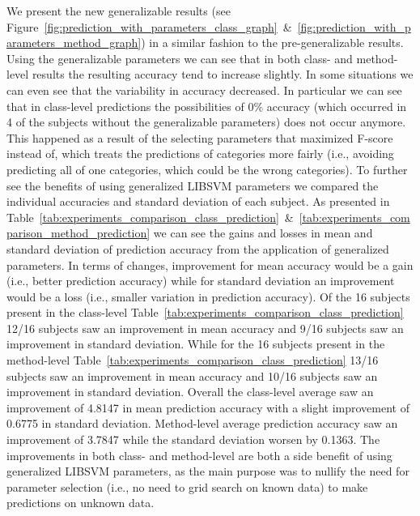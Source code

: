 We present the new generalizable results (see Figure~\ref{fig:prediction_with_parameters_class_graph}~\&~\ref{fig:prediction_with_parameters_method_graph}) in a similar fashion to the pre-generalizable results. Using the generalizable parameters we can see that in both class- and method-level results the resulting accuracy tend to increase slightly. In some situations we can even see that the variability in accuracy decreased. In particular we can see that in class-level predictions the possibilities of 0\% accuracy (which occurred in 4 of the subjects without the generalizable parameters) does not occur anymore. This happened as a result of the selecting parameters that maximized F-score instead of, which treats the predictions of categories more fairly (i.e., avoiding predicting all of one categories, which could be the wrong categories). To further see the benefits of using generalized LIBSVM parameters we compared the individual accuracies and standard deviation of each subject. As presented in Table~\ref{tab:experiments_comparison_class_prediction}~\&~\ref{tab:experiments_comparison_method_prediction} we can see the gains and losses in mean and standard deviation of prediction accuracy from the application of generalized parameters. In terms of changes, improvement for mean accuracy would be a gain (i.e., better prediction accuracy) while for standard deviation an improvement would be a loss (i.e., smaller variation in prediction accuracy). Of the 16 subjects present in the class-level Table~\ref{tab:experiments_comparison_class_prediction} 12/16 subjects saw an improvement in mean accuracy and 9/16 subjects saw an improvement in standard deviation. While for the 16 subjects present in the method-level Table~\ref{tab:experiments_comparison_class_prediction} 13/16 subjects saw an improvement in mean accuracy and 10/16 subjects saw an improvement in standard deviation. Overall the class-level average saw an improvement of 4.8147 in mean prediction accuracy with a slight improvement of 0.6775 in standard deviation. Method-level average prediction accuracy saw an improvement of 3.7847 while the standard deviation worsen by 0.1363. The improvements in both class- and method-level are both a side benefit of using generalized LIBSVM parameters, as the main purpose was to nullify the need for parameter selection (i.e., no need to grid search on known data) to make predictions on unknown data.

